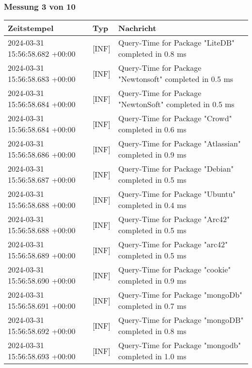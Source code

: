     \subsubsection*{Messung 3 von 10} \label{subsubsec:MySQLMitIndex3von10}
        {
            {\small
                \begin{tabularx}{\textwidth}{|l|l|X|}
                    \hline
                    \textbf{Zeitstempel} & \textbf{Typ} & \textbf{Nachricht} \\
                    \hline
                    \endhead
                    2024-03-31 15:56:58.682 +00:00 & [INF] & Query-Time for Package "LiteDB" completed in 0.8 ms \\
                    2024-03-31 15:56:58.683 +00:00 & [INF] & Query-Time for Package "Newtonsoft" completed in 0.5 ms \\
                    2024-03-31 15:56:58.684 +00:00 & [INF] & Query-Time for Package "NewtonSoft" completed in 0.5 ms \\
                    2024-03-31 15:56:58.684 +00:00 & [INF] & Query-Time for Package "Crowd" completed in 0.6 ms \\
                    2024-03-31 15:56:58.686 +00:00 & [INF] & Query-Time for Package "Atlassian" completed in 0.9 ms \\
                    2024-03-31 15:56:58.687 +00:00 & [INF] & Query-Time for Package "Debian" completed in 0.5 ms \\
                    2024-03-31 15:56:58.688 +00:00 & [INF] & Query-Time for Package "Ubuntu" completed in 0.4 ms \\
                    2024-03-31 15:56:58.688 +00:00 & [INF] & Query-Time for Package "Arc42" completed in 0.5 ms \\
                    2024-03-31 15:56:58.689 +00:00 & [INF] & Query-Time for Package "arc42" completed in 0.5 ms \\
                    2024-03-31 15:56:58.690 +00:00 & [INF] & Query-Time for Package "cookie" completed in 0.9 ms \\
                    2024-03-31 15:56:58.691 +00:00 & [INF] & Query-Time for Package "mongoDb" completed in 0.7 ms \\
                    2024-03-31 15:56:58.692 +00:00 & [INF] & Query-Time for Package "mongoDB" completed in 0.8 ms \\
                    2024-03-31 15:56:58.693 +00:00 & [INF] & Query-Time for Package "mongodb" completed in 1.0 ms \\

\end{tabularx}}}
